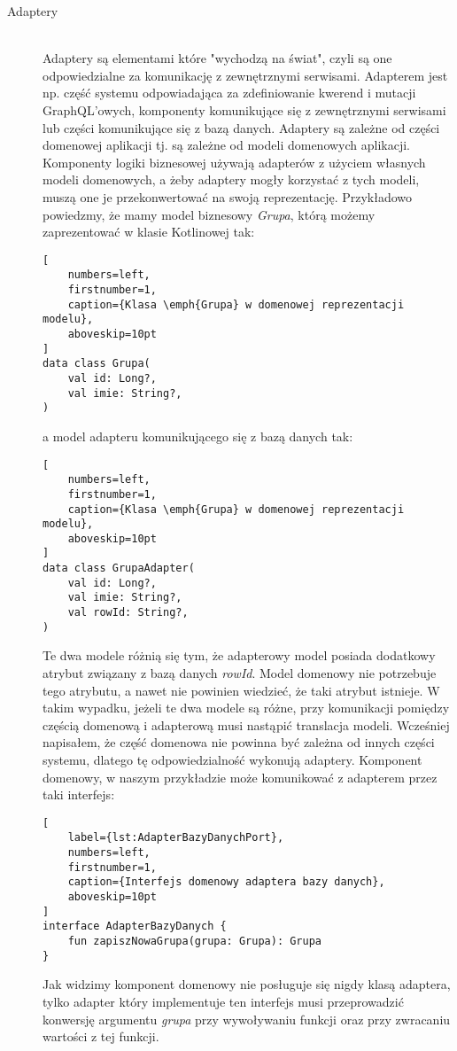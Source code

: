 \begin{description}
\item[Adaptery] \hfill \\ Adaptery są elementami które "wychodzą na świat", czyli są one odpowiedzialne za komunikację z zewnętrznymi serwisami. Adapterem jest np. część systemu odpowiadająca za zdefiniowanie kwerend i mutacji GraphQL'owych, komponenty komunikujące się z zewnętrznymi serwisami lub części komunikujące się z bazą danych. Adaptery są zależne od części domenowej aplikacji tj. są zależne od modeli domenowych aplikacji. Komponenty logiki biznesowej używają adapterów z użyciem własnych modeli domenowych, a żeby adaptery mogły korzystać z tych modeli, muszą one je przekonwertować na swoją reprezentację. Przykładowo powiedzmy, że mamy model biznesowy \emph{Grupa}, którą możemy zaprezentować w klasie Kotlinowej tak:


\begin{addmargin}[6mm]{0mm}
\begin{lstlisting}[
    numbers=left,
    firstnumber=1,
    caption={Klasa \emph{Grupa} w domenowej reprezentacji modelu},
    aboveskip=10pt
]
data class Grupa(
    val id: Long?,
    val imie: String?,
)
\end{lstlisting}
\end{addmargin}

a model adapteru komunikującego się z bazą danych tak:
\begin{addmargin}[6mm]{0mm}
\begin{lstlisting}[
    numbers=left,
    firstnumber=1,
    caption={Klasa \emph{Grupa} w domenowej reprezentacji modelu},
    aboveskip=10pt
]
data class GrupaAdapter(
    val id: Long?,
    val imie: String?,
    val rowId: String?,
)
\end{lstlisting}
\end{addmargin}
Te dwa modele różnią się tym, że adapterowy model posiada dodatkowy atrybut związany z bazą danych \emph{rowId}. Model domenowy nie potrzebuje tego atrybutu, a nawet nie powinien wiedzieć, że taki atrybut istnieje. W takim wypadku, jeżeli te dwa modele są różne, przy komunikacji pomiędzy częścią domenową i adapterową musi nastąpić translacja modeli. Wcześniej napisałem, że część domenowa nie powinna być zależna od innych części systemu, dlatego tę odpowiedzialność wykonują adaptery. Komponent domenowy, w naszym przykładzie może komunikować z adapterem przez taki interfejs:
\begin{addmargin}[6mm]{0mm}
\begin{lstlisting}[
    label={lst:AdapterBazyDanychPort},
    numbers=left,
    firstnumber=1,
    caption={Interfejs domenowy adaptera bazy danych},
    aboveskip=10pt
]
interface AdapterBazyDanych {
    fun zapiszNowaGrupa(grupa: Grupa): Grupa
}
\end{lstlisting}
\end{addmargin}
Jak widzimy komponent domenowy nie posługuje się nigdy klasą adaptera, tylko adapter który implementuje ten interfejs musi przeprowadzić konwersję argumentu \emph{grupa} przy wywoływaniu funkcji oraz przy zwracaniu wartości z tej funkcji.


\end{description}

